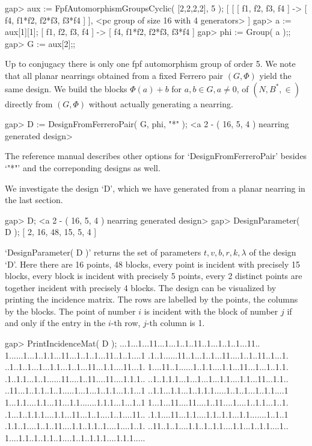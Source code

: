 \beginexample
    gap> aux := FpfAutomorphismGroupsCyclic( [2,2,2,2], 5 );
    [ [ [ f1, f2, f3, f4 ] -> [ f4, f1*f2, f2*f3, f3*f4 ] ], 
      <pc group of size 16 with 4 generators> ]
    gap> a := aux[1][1];
    [ f1, f2, f3, f4 ] -> [ f4, f1*f2, f2*f3, f3*f4 ]
    gap> phi := Group( a );;
    gap> G := aux[2];;
\endexample
    
Up to conjugacy there is only one fpf automorphism group of order 5.
We note that all planar nearrings obtained from a fixed Ferrero pair 
$(G,\Phi)$ yield the same design. We build the blocks $\Phi(a)+b$ for
$a,b\in G, a\not=0$, of $(N,B^{*},\in)$ directly from $(G,\Phi)$ without
actually generating a nearring.
    
\beginexample 
    gap> D := DesignFromFerreroPair( G, phi, "*" );
    <a 2 - ( 16, 5, 4 ) nearring generated design>
\endexample
    
The reference manual describes other options for `DesignFromFerreroPair' 
besides `"*"' and the correponding designs as well.
    


We investigate the design `D', which we have generated from a planar
nearring in the last section.

\beginexample    
    gap> D;
    <a 2 - ( 16, 5, 4 ) nearring generated design>
    gap> DesignParameter( D );
    [ 2, 16, 48, 15, 5, 4 ]
\endexample
    
`DesignParameter( D )' returns the set of parameters $t, v, b, r, k, \lambda$ 
of the design `D'. Here there are 16 points, 48 blocks,
every point is incident with precisely 15 blocks, every block is incident 
with precisely 5 points, every 2 distinct points are together incident
with precisely 4 blocks. The design can be visualized by printing the
incidence matrix. The rows are labelled by the points, the columns by
the blocks. The point of number $i$ is incident with the block of number $j$ 
if and only if the entry in the $i$-th row, $j$-th column is 1. 
    
\beginexample
    gap> PrintIncidenceMat( D );
    ...1...1...11...1...1..1..11..1...1..1..1...11..
    1......1...1..1.1...11...1..1..1...11..1..1....1
    .1..1......11..1...1..1...11....1..1..11..1...1.
    ..1..1..1...1...1.1...1..1...11...1.1....11...1.
    1....11..1......1..1.1....1.1...11...1...1..1.1.
    .1..1.1...1..1......11....1..11....11....1.1.1..
    ..1..1.1.1...1...1...1...1.1....1.1...11...1.1..
    ..11...1..1.1..1..1.....1...1...1..1.1...1.1...1
    ..1.1...1.1...1..1.1.1.....1..1..1...1..1.1....1
    1...1.1....1.1...11...1.1.......1.1.1...1...1..1
    1...1...11....11....1..11....1....1..1.1...1..1.
    .1...1..1.1.1....1.1...11...1..1....1..1....11..
    .1.1....11...1.1....1.1..1.1...1.1.......1..1..1
    .1.1..1....1..1..11....1.1..1.1..1....1....1..1.
    ..11..1..1....1.1..1..1.1....1.1...1..1.1....1..
    1....1.1..1..1.1..1....1..1..1.1.1....1.1.1.....
\endexample    

